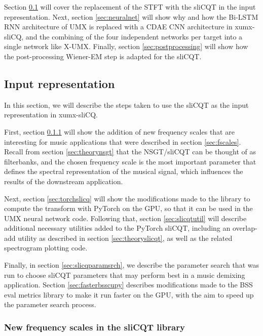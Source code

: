 \documentclass[report.tex]{subfiles}
\begin{document}
Section \ref{sec:inputrepresentation} will cover the replacement of the STFT with the sliCQT in the input representation. Next, section \ref{sec:neuralnet} will show why and how the Bi-LSTM RNN architecture of UMX is replaced with a CDAE CNN architecture in xumx-sliCQ, and the combining of the four independent networks per target into a single network like X-UMX. Finally, section \ref{sec:postprocessing} will show how the post-processing Wiener-EM step is adapted for the sliCQT.

\subsection{Input representation}
\label{sec:inputrepresentation}

In this section, we will describe the steps taken to use the sliCQT as the input representation in xumx-sliCQ.

First, section \ref{sec:improvelib} will show the addition of new frequency scales that are interesting for music applications that were described in section \ref{sec:fscales}. Recall from section \ref{sec:theorynsgt} that the NSGT/sliCQT can be thought of as filterbanks, and the chosen frequency scale is the most important parameter that defines the spectral representation of the musical signal, which influences the results of the downstream application.

Next, section \ref{sec:torchslicq} will show the modifications made to the library to compute the transform with PyTorch on the GPU, so that it can be used in the UMX neural network code. Following that, section \ref{sec:slicqtutil} will describe additional necessary utilities added to the PyTorch sliCQT, including an overlap-add utility as described in section \ref{sec:theoryslicqt}, as well as the related spectrogram plotting code.

Finally, in section \ref{sec:slicqparamsrch}, we describe the parameter search that was run to choose sliCQT parameters that may perform best in a music demixing application. Section \ref{sec:fasterbsscupy} describes modifications made to the BSS eval metrics library to make it run faster on the GPU, with the aim to speed up the parameter search process.

\subsubsection{New frequency scales in the sliCQT library}
\label{sec:improvelib}
\end{document}
